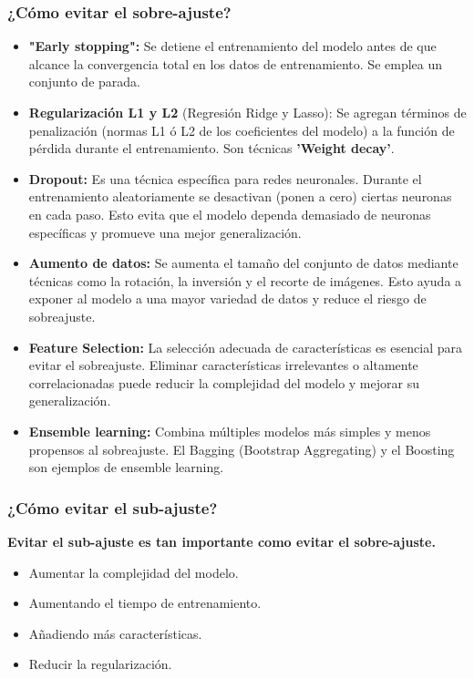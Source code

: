 \subsubsection*{¿Cómo evitar el \textbf{sobre}-ajuste?}
\begin{itemize}
	\item \textbf{"Early stopping":} Se detiene el entrenamiento del modelo antes de que alcance la convergencia total en los datos de entrenamiento. Se emplea un conjunto de parada.
	\item \textbf{Regularización L1 y L2} (Regresión Ridge y Lasso): Se agregan términos de penalización (normas L1 ó L2 de los coeficientes del modelo) a la función de pérdida durante el entrenamiento. Son técnicas \textbf{'Weight decay'}.
	\item \textbf{Dropout:} Es una técnica específica para redes neuronales. Durante el entrenamiento aleatoriamente se desactivan (ponen a cero) ciertas neuronas en cada paso. Esto evita que el modelo dependa demasiado de neuronas específicas y promueve una mejor generalización.
	\item \textbf{Aumento de datos:} Se aumenta el tamaño del conjunto de datos mediante técnicas como la rotación, la inversión y el recorte de imágenes. Esto ayuda a exponer al modelo a una mayor variedad de datos y reduce el riesgo de sobreajuste.
	\item \textbf{Feature Selection:} La selección adecuada de características es esencial para evitar el sobreajuste. Eliminar características irrelevantes o altamente correlacionadas puede reducir la complejidad del modelo y mejorar su generalización.
	\item \textbf{Ensemble learning:} Combina múltiples modelos más simples y menos propensos al sobreajuste. El Bagging (Bootstrap Aggregating) y el Boosting son ejemplos de ensemble learning.
\end{itemize}
\subsubsection*{¿Cómo evitar el \textbf{sub}-ajuste?}
\textbf{Evitar el sub-ajuste es tan importante como evitar el sobre-ajuste.}
\begin{itemize}
	\item Aumentar la complejidad del modelo.
	\item Aumentando el tiempo de entrenamiento.
	\item Añadiendo más características.
	\item Reducir la regularización.
\end{itemize}
